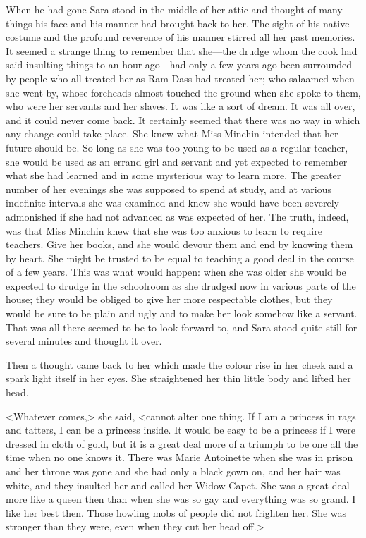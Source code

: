 When he had gone Sara stood in the middle of her attic and thought of many things his face and his manner had brought back to her. The sight of his native costume and the profound reverence of his manner stirred all her past memories. It seemed a strange thing to remember that she—the drudge whom the cook had said insulting things to an hour ago—had only a few years ago been surrounded by people who all treated her as Ram Dass had treated her; who salaamed when she went by, whose foreheads almost touched the ground when she spoke to them, who were her servants and her slaves. It was like a sort of dream. It was all over, and it could never come back. It certainly seemed that there was no way in which any change could take place. She knew what Miss Minchin intended that her future should be. So long as she was too young to be used as a regular teacher, she would be used as an errand girl and servant and yet expected to remember what she had learned and in some mysterious way to learn more. The greater number of her evenings she was supposed to spend at study, and at various indefinite intervals she was examined and knew she would have been severely admonished if she had not advanced as was expected of her. The truth, indeed, was that Miss Minchin knew that she was too anxious to learn to require teachers. Give her books, and she would devour them and end by knowing them by heart. She might be trusted to be equal to teaching a good deal in the course of a few years. This was what would happen: when she was older she would be expected to drudge in the schoolroom as she drudged now in various parts of the house; they would be obliged to give her more respectable clothes, but they would be sure to be plain and ugly and to make her look somehow like a servant. That was all there seemed to be to look forward to, and Sara stood quite still for several minutes and thought it over.

Then a thought came back to her which made the colour rise in her cheek and a spark light itself in her eyes. She straightened her thin little body and lifted her head.

<Whatever comes,> she said, <cannot alter one thing. If I am a princess in rags and tatters, I can be a princess inside. It would be easy to be a princess if I were dressed in cloth of gold, but it is a great deal more of a triumph to be one all the time when no one knows it. There was Marie Antoinette when she was in prison and her throne was gone and she had only a black gown on, and her hair was white, and they insulted her and called her Widow Capet. She was a great deal more like a queen then than when she was so gay and everything was so grand. I like her best then. Those howling mobs of people did not frighten her. She was stronger than they were, even when they cut her head off.>


